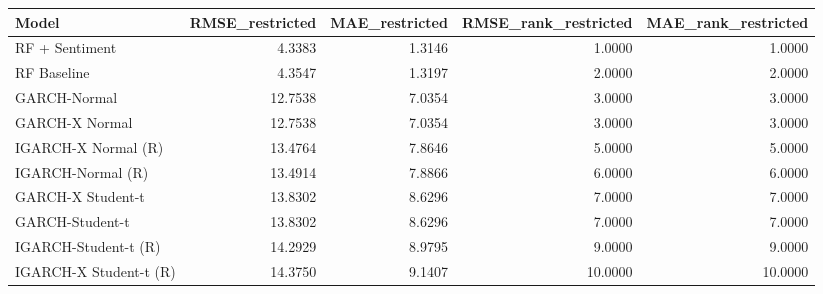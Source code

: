 \begin{tabular}{lrrrr}
\toprule
Model & RMSE_restricted & MAE_restricted & RMSE_rank_restricted & MAE_rank_restricted \\
\midrule
RF + Sentiment & 4.3383 & 1.3146 & 1.0000 & 1.0000 \\
RF Baseline & 4.3547 & 1.3197 & 2.0000 & 2.0000 \\
GARCH-Normal & 12.7538 & 7.0354 & 3.0000 & 3.0000 \\
GARCH-X Normal & 12.7538 & 7.0354 & 3.0000 & 3.0000 \\
IGARCH-X Normal (R) & 13.4764 & 7.8646 & 5.0000 & 5.0000 \\
IGARCH-Normal (R) & 13.4914 & 7.8866 & 6.0000 & 6.0000 \\
GARCH-X Student-t & 13.8302 & 8.6296 & 7.0000 & 7.0000 \\
GARCH-Student-t & 13.8302 & 8.6296 & 7.0000 & 7.0000 \\
IGARCH-Student-t (R) & 14.2929 & 8.9795 & 9.0000 & 9.0000 \\
IGARCH-X Student-t (R) & 14.3750 & 9.1407 & 10.0000 & 10.0000 \\
\bottomrule
\end{tabular}
